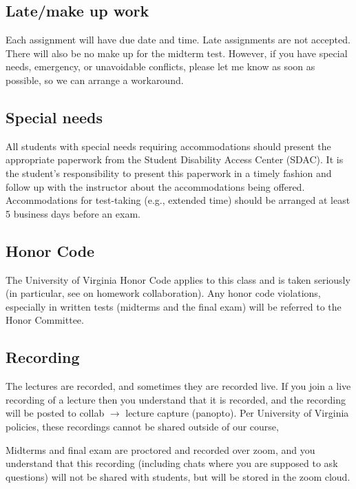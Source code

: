 \documentclass[oneside,11pt]{amsart}
\begin{document}
\subsection{Late/make up work} Each assignment will have due date and time.
Late assignments are not accepted. There will also be no make up for the midterm test.
However, if you have special needs, emergency, or unavoidable conflicts, please
let me know as soon as possible, so we can arrange a workaround.

\subsection{Special needs}

All students with special needs requiring accommodations should present the
appropriate paperwork from the Student Disability Access Center (SDAC). It is
the student's responsibility to present this paperwork in a timely fashion and
follow up with the instructor about the accommodations being offered.
Accommodations for test-taking (e.g., extended time) should be arranged at
least 5 business days before an exam.

\subsection{Honor Code} The University of Virginia Honor Code applies to this
class and is taken seriously (in particular, 
see  on homework collaboration).
Any honor code violations,
especially in written tests (midterms and the final exam)
will be referred to the
Honor Committee.

\subsection{Recording}

The lectures are recorded, and sometimes they are recorded live. 
If you join a live recording of a lecture then you understand that it is
recorded, and the recording will be posted to collab $\to$ lecture capture (panopto).
Per University of Virginia
policies,
these recordings cannot be shared outside of our course, 

Midterms and final exam are proctored and recorded over zoom, and 
you understand that this recording (including chats where you are supposed to ask questions)
will not be shared with students, but will be stored in the zoom cloud.
\end{document}
